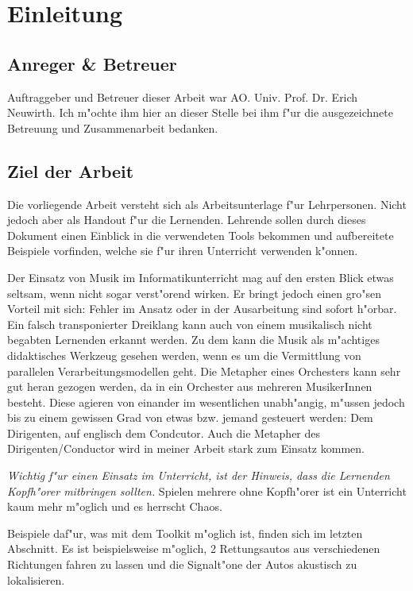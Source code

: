 \section{Einleitung}
\subsection{Anreger \& Betreuer}
Auftraggeber und Betreuer dieser Arbeit war AO. Univ. Prof. Dr. Erich Neuwirth.
Ich m"ochte ihm hier an dieser Stelle bei ihm f"ur die ausgezeichnete Betreuung
und Zusammenarbeit bedanken.

\subsection{Ziel der Arbeit}
Die vorliegende Arbeit versteht sich als Arbeitsunterlage f"ur Lehrpersonen.
Nicht jedoch aber als Handout f"ur die Lernenden. Lehrende sollen durch dieses
Dokument einen Einblick in die verwendeten Tools bekommen und aufbereitete
Beispiele vorfinden, welche sie f"ur ihren Unterricht verwenden k"onnen.

Der Einsatz von Musik im Informatikunterricht mag auf den ersten Blick etwas
seltsam, wenn nicht sogar verst"orend wirken. Er bringt jedoch einen gro"sen
Vorteil mit sich: Fehler im Ansatz oder in der Ausarbeitung sind sofort
h"orbar. Ein falsch transponierter Dreiklang kann auch von einem musikalisch
nicht begabten Lernenden erkannt werden. Zu dem kann die Musik als m"achtiges
didaktisches Werkzeug gesehen werden, wenn es um die Vermittlung von parallelen
Verarbeitungsmodellen geht. Die Metapher eines Orchesters kann sehr gut heran
gezogen werden, da in ein Orchester aus mehreren MusikerInnen besteht. Diese
agieren von einander im wesentlichen unabh"angig, m"ussen jedoch bis zu einem
gewissen Grad von etwas bzw. jemand gesteuert werden: Dem Dirigenten, auf
englisch dem Condcutor. Auch die Metapher des Dirigenten/Conductor wird in 
meiner Arbeit stark zum Einsatz kommen. 

\emph{Wichtig f"ur einen Einsatz im Unterricht, ist der Hinweis, dass die
Lernenden Kopfh"orer mitbringen sollten.} Spielen mehrere ohne Kopfh"orer
ist ein Unterricht kaum mehr m"oglich und es herrscht Chaos. 

Beispiele daf"ur, was mit dem Toolkit m"oglich ist, finden sich im letzten 
Abschnitt. Es ist beispielsweise m"oglich, 2 Rettungsautos aus verschiedenen 
Richtungen fahren zu lassen und die Signalt"one der Autos akustisch zu lokalisieren.


